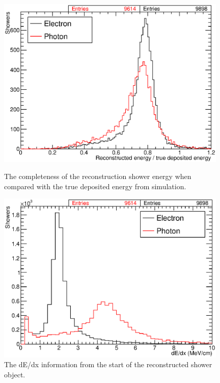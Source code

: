 \begin{figure}
  \begin{minipage}[t]{0.48\linewidth}
    \centering
    \includegraphics[width=0.98\textwidth]{ShowerDepositedEnergy.eps}
    \caption[The completeness of the reconstruction shower energy when compared with the true deposited energy from simulation.]{The completeness of the reconstruction shower energy when compared with the true deposited energy from simulation.}
    \label{fig:ShowerEnergy}
  \end{minipage}
  \hfill
  \begin{minipage}[t]{0.48\linewidth}
    \centering
    \includegraphics[width=0.98\textwidth]{ShowerdEdx.eps}
    \caption[The dE/dx information from the start of the reconstructed shower object.]{The dE/dx information from the start of the reconstructed shower object.}
    \label{fig:ShowerdEdx}
  \end{minipage}
\end{figure}

